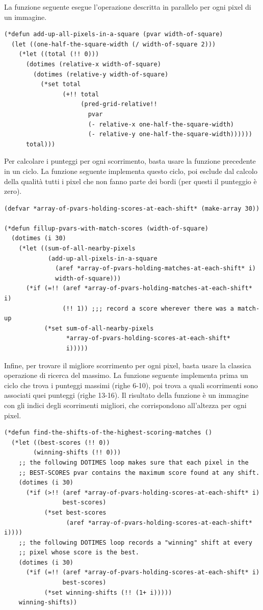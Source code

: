 \documentclass[12pt,a4paper,openright,twoside]{report}
\begin{document}
La funzione seguente esegue l'operazione descritta in parallelo per ogni pixel di un immagine.

\begin{lstlisting}[style=mystyle]
(*defun add-up-all-pixels-in-a-square (pvar width-of-square)
  (let ((one-half-the-square-width (/ width-of-square 2)))
    (*let ((total (!! 0)))
      (dotimes (relative-x width-of-square)
        (dotimes (relative-y width-of-square)
          (*set total
                (+!! total
                     (pred-grid-relative!!
                       pvar
                       (- relative-x one-half-the-square-width)
                       (- relative-y one-half-the-square-width))))))
      total)))
\end{lstlisting}

Per calcolare i punteggi per ogni scorrimento, basta usare la funzione precedente in un ciclo. La funzione seguente implementa questo ciclo, poi esclude dal calcolo della qualità tutti i pixel che non fanno parte dei bordi (per questi il punteggio è zero).

\begin{lstlisting}[style=mystyle]
(defvar *array-of-pvars-holding-scores-at-each-shift* (make-array 30))

(*defun fillup-pvars-with-match-scores (width-of-square)
  (dotimes (i 30)
    (*let ((sum-of-all-nearby-pixels
            (add-up-all-pixels-in-a-square
              (aref *array-of-pvars-holding-matches-at-each-shift* i)
              width-of-square)))
      (*if (=!! (aref *array-of-pvars-holding-matches-at-each-shift* i)
                (!! 1)) ;;; record a score wherever there was a match-up
           (*set sum-of-all-nearby-pixels
                 *array-of-pvars-holding-scores-at-each-shift*
                 i)))))
\end{lstlisting}

Infine, per trovare il migliore scorrimento per ogni pixel, basta usare la classica operazione di ricerca del massimo. La funzione seguente implementa prima un ciclo che trova i punteggi massimi (righe 6-10), poi trova a quali scorrimenti sono associati quei punteggi (righe 13-16). Il risultato della funzione è un immagine con gli indici degli scorrimenti migliori, che corrispondono all'altezza per ogni pixel.

\begin{lstlisting}[style=mystyle]
(*defun find-the-shifts-of-the-highest-scoring-matches ()
  (*let ((best-scores (!! 0))
        (winning-shifts (!! 0)))
    ;; the following DOTIMES loop makes sure that each pixel in the
    ;; BEST-SCORES pvar contains the maximum score found at any shift.
    (dotimes (i 30)
      (*if (>!! (aref *array-of-pvars-holding-scores-at-each-shift* i)
                best-scores)
           (*set best-scores
                 (aref *array-of-pvars-holding-scores-at-each-shift* i))))
    ;; the following DOTIMES loop records a "winning" shift at every
    ;; pixel whose score is the best.
    (dotimes (i 30)
      (*if (=!! (aref *array-of-pvars-holding-scores-at-each-shift* i)
                best-scores)
           (*set winning-shifts (!! (1+ i)))))
    winning-shifts))
\end{lstlisting}
\end{document}

